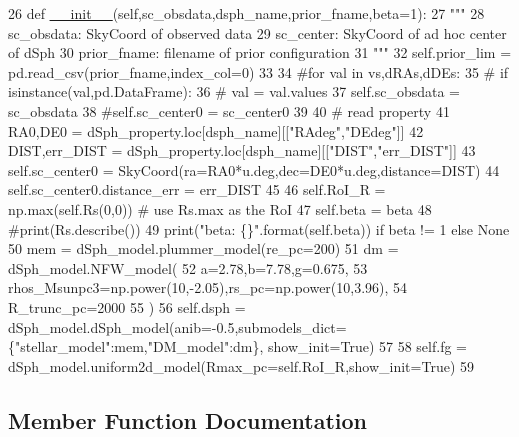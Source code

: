 \begin{DoxyCode}
26     \textcolor{keyword}{def }\hyperlink{classsampler_1_1Sampler_a0ebbb93e5c948bc426658cbdc92bfd12}{\_\_init\_\_}(self,sc\_obsdata,dsph\_name,prior\_fname,beta=1):
27         \textcolor{stringliteral}{"""}
28 \textcolor{stringliteral}{        sc\_obsdata: SkyCoord of observed data}
29 \textcolor{stringliteral}{        sc\_center: SkyCoord of ad hoc center of dSph}
30 \textcolor{stringliteral}{        prior\_fname: filename of prior configuration}
31 \textcolor{stringliteral}{        """}
32         self.prior\_lim = pd.read\_csv(prior\_fname,index\_col=0)
33         
34         \textcolor{comment}{#for val in vs,dRAs,dDEs:}
35         \textcolor{comment}{#    if isinstance(val,pd.DataFrame):}
36         \textcolor{comment}{#        val = val.values}
37         self.sc\_obsdata = sc\_obsdata
38         \textcolor{comment}{#self.sc\_center0 = sc\_center0}
39         
40         \textcolor{comment}{# read property}
41         RA0,DE0 = dSph\_property.loc[dsph\_name][[\textcolor{stringliteral}{"RAdeg"},\textcolor{stringliteral}{"DEdeg"}]]
42         DIST,err\_DIST = dSph\_property.loc[dsph\_name][[\textcolor{stringliteral}{"DIST"},\textcolor{stringliteral}{"err\_DIST"}]]
43         self.sc\_center0 = SkyCoord(ra=RA0*u.deg,dec=DE0*u.deg,distance=DIST)
44         self.sc\_center0.distance\_err = err\_DIST
45 
46         self.RoI\_R = np.max(self.Rs(0,0)) \textcolor{comment}{# use Rs.max as the RoI}
47         self.beta = beta
48         \textcolor{comment}{#print(Rs.describe())}
49         print(\textcolor{stringliteral}{"beta: \{\}"}.format(self.beta)) \textcolor{keywordflow}{if} beta != 1 \textcolor{keywordflow}{else} \textcolor{keywordtype}{None}
50         mem = dSph\_model.plummer\_model(re\_pc=200)
51         dm = dSph\_model.NFW\_model(
52             a=2.78,b=7.78,g=0.675,
53             rhos\_Msunpc3=np.power(10,-2.05),rs\_pc=np.power(10,3.96),
54             R\_trunc\_pc=2000
55         )
56         self.dsph = dSph\_model.dSph\_model(anib=-0.5,submodels\_dict=\{\textcolor{stringliteral}{"stellar\_model"}:mem,\textcolor{stringliteral}{"DM\_model"}:dm\},
      show\_init=\textcolor{keyword}{True})
57         
58         self.fg = dSph\_model.uniform2d\_model(Rmax\_pc=self.RoI\_R,show\_init=\textcolor{keyword}{True})
59     
\end{DoxyCode}


\subsection{Member Function Documentation}
\mbox{\label{class__modKI17_1_1modKI17_a20bf807508e322e3920b4bac36a8478a}} 
